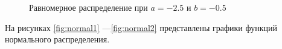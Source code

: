 \begin{figure}[h!]
	\caption{Равномерное распределение при $a = -2.5$ и $b = -0.5$}
	\label{fig:uniform2}
\end{figure}

\newpage
На рисунках \ref{fig:normal1} ---\ref{fig:normal2} представлены графики функций нормального распределения.

